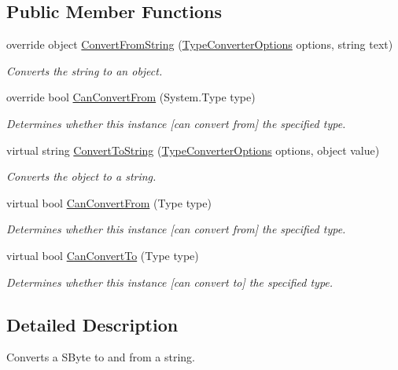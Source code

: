 \subsection*{Public Member Functions}
\begin{DoxyCompactItemize}
\item 
override object \hyperlink{a00148_ad16aeb03f418c89b3f78e95b46a46b40}{Convert\-From\-String} (\hyperlink{a00168}{Type\-Converter\-Options} options, string text)
\begin{DoxyCompactList}\small\item\em Converts the string to an object. \end{DoxyCompactList}\item 
override bool \hyperlink{a00148_a8f6d23460e0ddfe883cc06ded76bf633}{Can\-Convert\-From} (System.\-Type type)
\begin{DoxyCompactList}\small\item\em Determines whether this instance \mbox{[}can convert from\mbox{]} the specified type. \end{DoxyCompactList}\item 
virtual string \hyperlink{a00078_a36cb2f9b24f15a671293f3a722324c27}{Convert\-To\-String} (\hyperlink{a00168}{Type\-Converter\-Options} options, object value)
\begin{DoxyCompactList}\small\item\em Converts the object to a string. \end{DoxyCompactList}\item 
virtual bool \hyperlink{a00078_a470d21adaa704eb281250dbd112ff91a}{Can\-Convert\-From} (Type type)
\begin{DoxyCompactList}\small\item\em Determines whether this instance \mbox{[}can convert from\mbox{]} the specified type. \end{DoxyCompactList}\item 
virtual bool \hyperlink{a00078_acb65bd8c8199d88d5b1629ae35d18514}{Can\-Convert\-To} (Type type)
\begin{DoxyCompactList}\small\item\em Determines whether this instance \mbox{[}can convert to\mbox{]} the specified type. \end{DoxyCompactList}\end{DoxyCompactItemize}


\subsection{Detailed Description}
Converts a S\-Byte to and from a string. 



